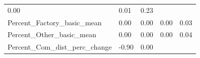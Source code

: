 \documentclass[]{article}
\begin{document}
\begin{longtable}[]{@{}lllll@{}}
\begin{minipage}[t]{0.09\columnwidth}
0.00\strut
\end{minipage} & \begin{minipage}[t]{0.09\columnwidth}\raggedright\strut
0.01\strut
\end{minipage} & \begin{minipage}[t]{0.11\columnwidth}\raggedright\strut
0.23\strut
\end{minipage}\tabularnewline
\begin{minipage}[t]{0.49\columnwidth}\raggedright\strut
Percent\_Factory\_basic\_mean\strut
\end{minipage} & \begin{minipage}[t]{0.08\columnwidth}\raggedright\strut
0.00\strut
\end{minipage} & \begin{minipage}[t]{0.09\columnwidth}\raggedright\strut
0.00\strut
\end{minipage} & \begin{minipage}[t]{0.09\columnwidth}\raggedright\strut
0.00\strut
\end{minipage} & \begin{minipage}[t]{0.11\columnwidth}\raggedright\strut
0.03\strut
\end{minipage}\tabularnewline
\begin{minipage}[t]{0.49\columnwidth}\raggedright\strut
Percent\_Other\_basic\_mean\strut
\end{minipage} & \begin{minipage}[t]{0.08\columnwidth}\raggedright\strut
0.00\strut
\end{minipage} & \begin{minipage}[t]{0.09\columnwidth}\raggedright\strut
0.00\strut
\end{minipage} & \begin{minipage}[t]{0.09\columnwidth}\raggedright\strut
0.00\strut
\end{minipage} & \begin{minipage}[t]{0.11\columnwidth}\raggedright\strut
0.04\strut
\end{minipage}\tabularnewline
\begin{minipage}[t]{0.49\columnwidth}\raggedright\strut
Percent\_Com\_dist\_perc\_change\strut
\end{minipage} & \begin{minipage}[t]{0.08\columnwidth}\raggedright\strut
-0.90\strut
\end{minipage} & \begin{minipage}[t]{0.09\columnwidth}\raggedright\strut
0.00\strut
\end{minipage} & \begin{minipage}[t]{0.09\columnwidth}\raggedright\strut

\end{minipage}
\end{longtable}
\end{document}
